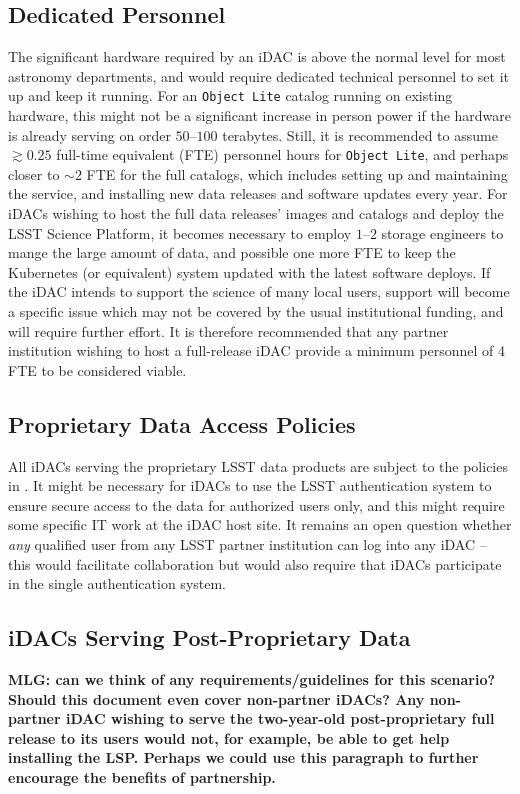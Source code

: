 \subsection{Dedicated Personnel}
The significant hardware required by an iDAC is above the normal level for most astronomy departments, and would require dedicated technical personnel to set it up and keep it running. For an {\tt Object Lite} catalog running on existing hardware, this might not be a significant increase in person power if the hardware is already serving on order $50$--$100$ terabytes. Still, it is recommended to assume $\gtrsim0.25$ full-time equivalent (FTE) personnel hours for {\tt Object Lite}, and perhaps closer to $\sim2$ FTE for the full catalogs, which includes setting up and maintaining the service, and installing new data releases and software updates every year. For iDACs wishing to host the full data releases' images and catalogs and deploy the LSST Science Platform, it becomes necessary to employ $1$--$2$ storage engineers to mange the large amount of data, and possible one more FTE to keep the Kubernetes (or equivalent) system updated with the latest software deploys. If the iDAC intends to support the science of many local users, support will become a specific issue which may not be covered by the usual institutional funding, and will require further effort. It is therefore recommended that any partner institution wishing to host a full-release iDAC provide a minimum personnel of 4 FTE to be considered viable.

\subsection{Proprietary Data Access Policies}
All iDACs serving the proprietary LSST data products are subject to the policies in . It might be necessary for iDACs to use the LSST authentication system to ensure secure access to the data for authorized users only, and this might require some specific IT work at the iDAC host site. It remains an open question whether {\em any} qualified user from any LSST partner institution can log into any iDAC -- this would facilitate collaboration but would also require that iDACs participate in the single authentication system.

\subsection{iDACs Serving Post-Proprietary Data}
{\bf MLG: can we think of any requirements/guidelines for this scenario? Should this document even cover non-partner iDACs? Any non-partner iDAC wishing to serve the two-year-old post-proprietary full release to its users would not, for example, be able to get help installing the LSP. Perhaps we could use this paragraph to further encourage the benefits of partnership.}


